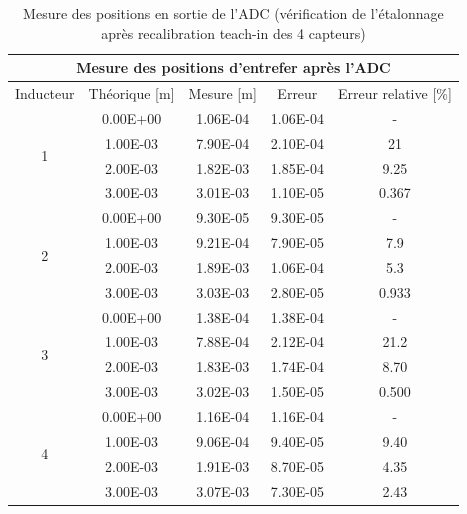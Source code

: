 \begin{table}[H]
    \centering
    \begin{tabular}{|c|c|c|c|c|}
        \hline
        \multicolumn{5}{|c|}{\textbf{Mesure des positions d'entrefer après l'ADC}}                    \\ \hline
        Inducteur          & Théorique {[}m{]} & Mesure {[}m{]} & Erreur   & Erreur relative {[}\%{]} \\ \hline
        \multirow{4}{*}{1} & 0.00E+00          & 1.06E-04       & 1.06E-04 & -                        \\ \cline{2-5}
                           & 1.00E-03          & 7.90E-04       & 2.10E-04 & 21                       \\ \cline{2-5}
                           & 2.00E-03          & 1.82E-03       & 1.85E-04 & 9.25                     \\ \cline{2-5}
                           & 3.00E-03          & 3.01E-03       & 1.10E-05 & 0.367                    \\ \hline
        \multirow{4}{*}{2} & 0.00E+00          & 9.30E-05       & 9.30E-05 & -                        \\ \cline{2-5}
                           & 1.00E-03          & 9.21E-04       & 7.90E-05 & 7.9                      \\ \cline{2-5}
                           & 2.00E-03          & 1.89E-03       & 1.06E-04 & 5.3                      \\ \cline{2-5}
                           & 3.00E-03          & 3.03E-03       & 2.80E-05 & 0.933                    \\ \hline
        \multirow{4}{*}{3} & 0.00E+00          & 1.38E-04       & 1.38E-04 & -                        \\ \cline{2-5}
                           & 1.00E-03          & 7.88E-04       & 2.12E-04 & 21.2                     \\ \cline{2-5}
                           & 2.00E-03          & 1.83E-03       & 1.74E-04 & 8.70                     \\ \cline{2-5}
                           & 3.00E-03          & 3.02E-03       & 1.50E-05 & 0.500                    \\ \hline
        \multirow{4}{*}{4} & 0.00E+00          & 1.16E-04       & 1.16E-04 & -                        \\ \cline{2-5}
                           & 1.00E-03          & 9.06E-04       & 9.40E-05 & 9.40                     \\ \cline{2-5}
                           & 2.00E-03          & 1.91E-03       & 8.70E-05 & 4.35                     \\ \cline{2-5}
                           & 3.00E-03          & 3.07E-03       & 7.30E-05 & 2.43                     \\ \hline
    \end{tabular}
    \caption{Mesure des positions en sortie de l'ADC (vérification de l'étalonnage après recalibration teach-in des 4 capteurs)}
    \label{tab:verif_etalonnage_teachin_adc}
\end{table}


